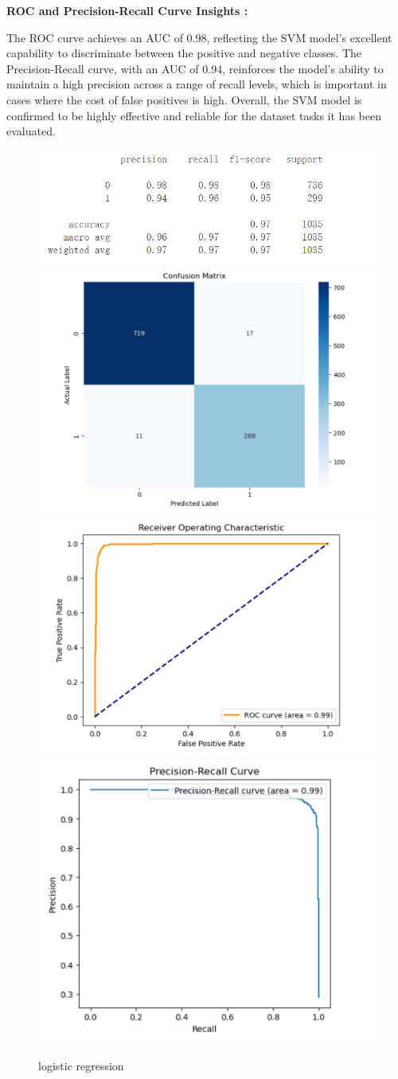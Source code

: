 \documentclass[conference]{IEEEtran}
\begin{document}
\textbf{ROC and Precision-Recall Curve Insights :}

The ROC curve achieves an AUC of 0.98, reflecting the SVM model's excellent capability to discriminate between the positive and negative classes. 
The Precision-Recall curve, with an AUC of 0.94, reinforces the model’s ability to maintain a high precision across a range of recall levels, which is important in cases where the cost of false positives is high. Overall, the SVM model is confirmed to be highly effective and reliable for the dataset tasks it has been evaluated.

\newpage

\begin{figure}[b]
    \centering
    \includegraphics[width=.4\textwidth]{logistic/3-1.png}\hfill
    \includegraphics[width=.4\textwidth]{logistic/3-2.png}
    \\[\smallskipamount]
    \includegraphics[width=.4\textwidth]{logistic/3-4.png}\hfill
    \includegraphics[width=.4\textwidth]{logistic/3-3.png}
    \caption{logistic regression}\label{logistic regression}
\end{figure}
\end{document}
